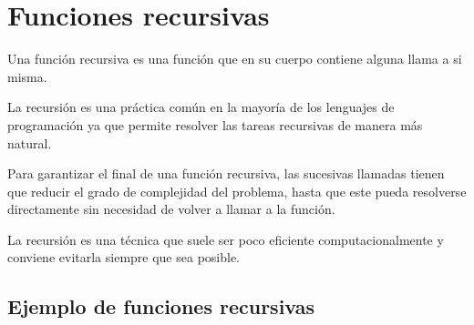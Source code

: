 \documentclass[
  letterpaper,
  DIV=11,
  numbers=noendperiod]{scrreprt}
\begin{document}
\hypertarget{funciones-recursivas}{%
\section{Funciones recursivas}\label{funciones-recursivas}}

Una función recursiva es una función que en su cuerpo contiene alguna
llama a si misma.

La recursión es una práctica común en la mayoría de los lenguajes de
programación ya que permite resolver las tareas recursivas de manera más
natural.

Para garantizar el final de una función recursiva, las sucesivas
llamadas tienen que reducir el grado de complejidad del problema, hasta
que este pueda resolverse directamente sin necesidad de volver a llamar
a la función.

\begin{tcolorbox}[enhanced jigsaw, colbacktitle=quarto-callout-caution-color!10!white, coltitle=black, opacityback=0, opacitybacktitle=0.6, bottomtitle=1mm, leftrule=.75mm, toprule=.15mm, bottomrule=.15mm, toptitle=1mm, breakable, colframe=quarto-callout-caution-color-frame, colback=white, rightrule=.15mm, titlerule=0mm, title=\textcolor{quarto-callout-caution-color}{\faFire}\hspace{0.5em}{Danger}, arc=.35mm, left=2mm]
La recursión es una técnica que suele ser poco eficiente
computacionalmente y conviene evitarla siempre que sea posible.
\end{tcolorbox}

\hypertarget{ejemplo-de-funciones-recursivas}{%
\subsection{Ejemplo de funciones
recursivas}\label{ejemplo-de-funciones-recursivas}}
\end{document}
